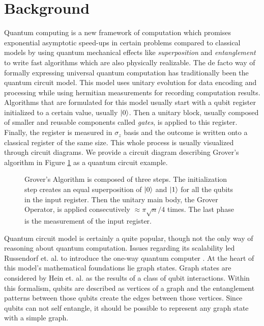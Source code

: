 \section{Background}

Quantum computing is a new framework of computation which promises exponential asymptotic speed-ups in certain problems compared to classical models by using quantum mechanical effects like \emph{superposition} and \emph{entanglement} to write fast algorithms which are also physically realizable. The de facto way of formally expressing universal quantum computation has traditionally been the quantum circuit model\cite{Nielsen2009}. This model uses unitary evolution for data encoding and processing while using hermitian measurements for recording computation results. Algorithms that are formulated for this model usually start with a qubit register initialized to a certain value, usually \(\lvert0\rangle\). Then a unitary block, usually composed of smaller and reusable components called \emph{gates}, is applied to this register. Finally, the register is measured in \(\sigma_z\) basis and the outcome is written onto a classical register of the same size. This whole process is usually visualized through circuit diagrams. We provide a circuit diagram describing Grover's algorithm in Figure \ref{fig:grover} as a quantum circuit example.

\begin{figure}[htb]
  \centering
  
  \caption{Grover's Algorithm is composed of three steps. The initialization step creates an equal superposition of \(\lvert0\rangle\) and \(\lvert1\rangle\) for all the qubits in the input register. Then the unitary main body, the Grover Operator, is applied consecutively \(\approx\pi\sqrt{n}/4\) times. The last phase is the measurement of the input register.}\label{fig:grover}
\end{figure}

Quantum circuit model is certainly a quite popular, though not the only way of reasoning about quantum computation. Issues regarding its scalability led Russendorf et. al. to introduce the one-way quantum computer \cite{russendorf2001, russendorf2003}. At the heart of this model's mathematical foundations lie graph states. Graph states are considered by Hein et. al. as the results of a class of qubit interactions\cite{hein2006}. Within this formalism, qubits are described as vertices of a graph and the entanglement patterns between those qubits create the edges between those vertices. Since qubits can not self entangle, it should be possible to represent any graph state with a simple graph. 


